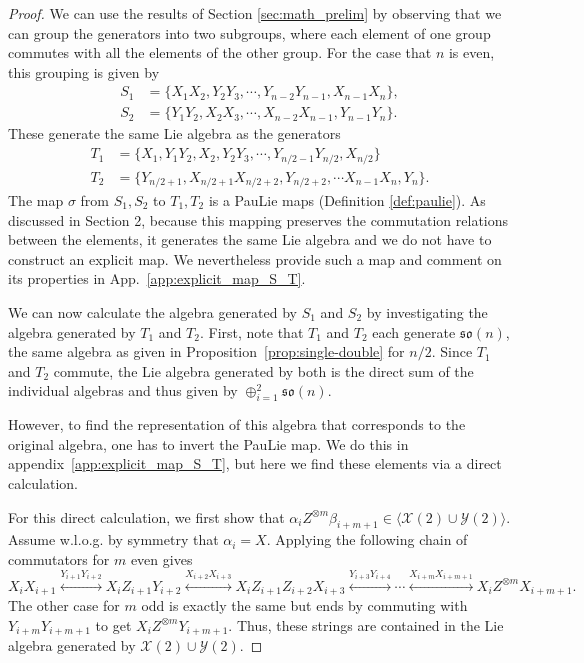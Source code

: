\documentclass[12pt, a4-paper]{amsart}
\newcommand{\cX}{\mathcal{X}}
\newcommand{\cY}{\mathcal{Y}}
\newcommand{\mf}[1]{\mathfrak{#1}}
\numberwithin{equation}{section}
\begin{document}
\begin{proof}
We can use the results of Section \ref{sec:math_prelim} by observing that we can group the generators into two subgroups, where each element of one group commutes with all the elements of the other group. For the case that $n$ is even, this grouping is given by
\begin{equation}\label{2.20}
\begin{aligned}
    S_1 &= \{X_1 X_2, Y_2 Y_3, \cdots, Y_{n-2} Y_{n-1}, X_{n-1} X_n\},  \\
    S_2 &= \{Y_1 Y_2, X_2 X_3, \cdots, X_{n-2} X_{n-1}, Y_{n-1} Y_n\}.
\end{aligned}
\end{equation}
These generate the same Lie algebra as the generators
\begin{equation}
\begin{aligned}
    T_1 &= \{X_1, Y_1 Y_2, X_2, Y_2 Y_3, \cdots, Y_{n/2-1} Y_{n/2}, X_{n/2} \} \\
    T_2 &= \{Y_{n/2+1}, X_{n/2+1}X_{n/2+2}, Y_{n/2+2}, \cdots  X_{n-1} X_n, Y_n \}.
\end{aligned}
\end{equation}
The map $\sigma$ from $S_1, S_2$ to $T_1, T_2$ is a PauLie maps (Definition \ref{def:paulie}). As discussed in Section 2, because this mapping preserves the commutation relations between the elements, it generates the same Lie algebra and we do not have to construct an explicit map. We nevertheless provide such a map and comment on its properties in App.~\ref{app:explicit_map_S_T}.

We can now calculate the algebra generated by $S_1$ and $S_2$ by investigating the algebra generated by $T_1$ and $T_2$. First, note that $T_1$ and $T_2$ each generate $\mf{so}(n)$, the same algebra as given in Proposition~\ref{prop:single-double} for $n/2$. Since $T_1$ and $T_2$ commute, the Lie algebra generated by both is the direct sum of the individual algebras and thus given by $\oplus_{i=1}^2 \mf{so}(n)$.

However, to find the representation of this algebra that corresponds to the original algebra, one has to invert the PauLie map. We do this in appendix~\ref{app:explicit_map_S_T}, but here we find these elements via a direct calculation.

For this direct calculation, we first show that $\alpha_i Z^{\otimes m} \beta_{i+m+1} \in \langle \cX(2) \cup \cY(2) \rangle$. Assume w.l.o.g. by symmetry that $\alpha_i = X$. Applying the following chain of commutators for $m$ even gives
\begin{equation}
    X_i X_{i+1} \stackrel{Y_{i+1} Y_{i+2}}{\longleftrightarrow} X_i Z_{i+1} Y_{i+2} \stackrel{X_{i+2} X_{i+3}}{\longleftrightarrow} X_i Z_{i+1} Z_{i+2} X_{i+3} \stackrel{Y_{i+3} Y_{i+4}}{\longleftrightarrow} \cdots \stackrel{X_{i+m} X_{i+m+1}}{\longleftrightarrow} X_i Z^{\otimes m} X_{i+m+1}.
\end{equation}
The other case for $m$ odd is exactly the same but ends by commuting with $Y_{i+m} Y_{i+m+1}$ to get $X_i Z^{\otimes m} Y_{i+m+1}$. Thus, these strings are contained in the Lie algebra generated by $\cX(2) \cup \cY(2)$.


\end{proof}
\end{document}
